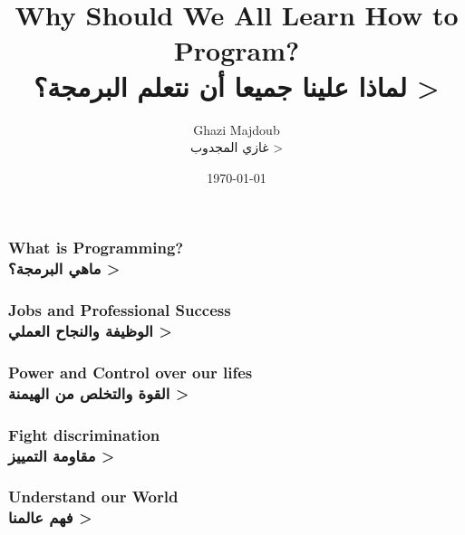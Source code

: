 \documentclass{beamer}
\begin{document}

\title{		Why Should We All Learn How to Program?\\ 
			\<
			لماذا علينا جميعا أن نتعلم البرمجة؟
			>
} %
\author{	Ghazi Majdoub\\
			\< 
			غازي المجدوب
			>
}
\date{\today}

	\begin{frame}
		\titlepage
	\end{frame}
	
	
	\begin{frame}
		\frametitle{What is Programming?\\
		\<
		ماهي البرمجة؟
		>
		}
	\end{frame}
	
	\begin{frame}
		\frametitle{Jobs and Professional Success\\
		\<
		الوظيفة والنجاح العملي
		>
		}
	\end{frame}
	
	\begin{frame}
		\frametitle{Power and Control over our lifes\\
		\<
		القوة والتخلص من الهيمنة
		>
		}
	\end{frame}
	
	\begin{frame}
		\frametitle{Fight discrimination\\
		\<
		مقاومة التمييز
		>
		}
	\end{frame}
	
	\begin{frame}
		\frametitle{Understand our World\\
		\<
		فهم عالمنا
		>
		}
	\end{frame}
	
\end{document}
